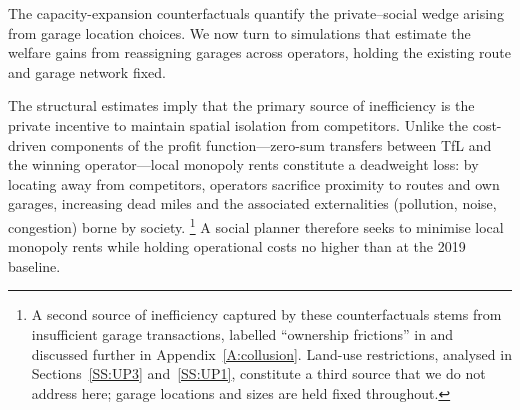 \documentclass[12pt]{article}
\newcommand{\florian}[1]{\textcolor[rgb]{0,0.5,0.99}{florian: #1}}
\begin{document}

The capacity-expansion counterfactuals quantify the private--social wedge
arising from garage location choices. We now turn to simulations that estimate
the welfare gains from reassigning garages across operators, holding the
existing route and garage network fixed.
 
The structural estimates imply that the primary source of inefficiency is the
private incentive to maintain spatial isolation from competitors. Unlike the
cost-driven components of the profit function---zero-sum transfers between TfL
and the winning operator---local monopoly rents constitute a deadweight loss:
by locating away from competitors, operators sacrifice proximity to routes and
own garages, increasing dead miles and the associated externalities (pollution,
noise, congestion) borne by society.%
\footnote{A second source of inefficiency captured by these counterfactuals
stems from insufficient garage transactions, labelled ``ownership frictions''
in \citet{marra-oswald} and discussed further in Appendix~\ref{A:collusion}.
Land-use restrictions, analysed in Sections~\ref{SS:UP3} and~\ref{SS:UP1},
constitute a third source that we do not address here; garage locations and
sizes are held fixed throughout.}
A social planner therefore seeks to minimise local monopoly rents while holding
operational costs no higher than at the 2019 baseline.
 
\end{document}
